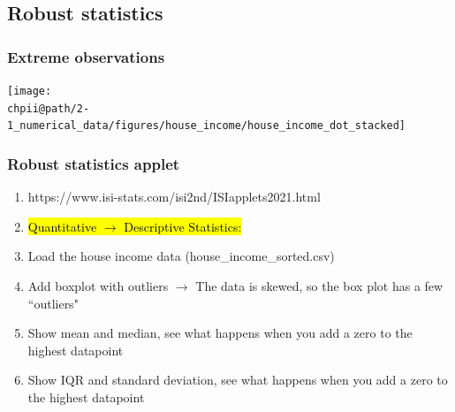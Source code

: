 \documentclass[slidestop,compress,mathserif]{beamer}
\makeatletter
\def\chpii@path{../../Chp 2}
\makeatother
\begin{document}
\subsection{Robust statistics}


\begin{frame}
\frametitle{Extreme observations}


\begin{center}
\texttt{[image: \\chpii@path/2-1\_numerical\_data/figures/house\_income/house\_income\_dot\_stacked]}
\end{center}

\end{frame}


\begin{frame}
\frametitle{Robust statistics applet}
\begin{enumerate}
  \item  https://www.isi-stats.com/isi2nd/ISIapplets2021.html
  \item \hl{Quantitative $\rightarrow$ Descriptive Statistics:}
  \item Load the house income data (house\_income\_sorted.csv)
  \item Add boxplot with outliers $\rightarrow$ The data is skewed, so the box plot has a few ``outliers"
  \item Show mean and median, see what happens when you add a zero to the highest datapoint
  \item Show IQR and standard deviation, see what happens when you add a zero to the highest datapoint
\end{enumerate}
\end{frame}
\end{document}
